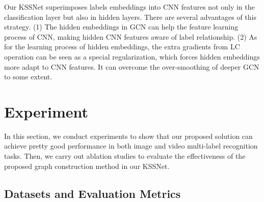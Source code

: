 \documentclass[letterpaper]{article} \usepackage{aaai20}  \usepackage{times}  \usepackage{helvet} \usepackage{courier}  \usepackage[hyphens]{url}  \usepackage{graphicx} \usepackage{subfigure}
\begin{document}
\begin{table*}[!t]
	\centering
	\footnotesize
\caption{Performance comparisons between baselines and KSSNet on MS-COCO. KSSNet is based on our proposed KS graph and has four GCN layers.}
	\label{coco}
	\end{table*}
Our KSSNet superimposes labels embeddings into CNN features not only in the classification layer but also in hidden layers. There are several advantages of this strategy. (1) The hidden embeddings in GCN can help the feature learning process of CNN, making hidden CNN features aware of label relationship. (2) As for the learning process of hidden embeddings, the extra gradients from LC operation can be seen as a special regularization, which forces hidden embeddings more adapt to CNN features. It can overcome the over-smoothing of deeper GCN to some extent.



\section{Experiment}
In this section, we conduct experiments to show that our proposed solution can achieve pretty good performance in both image and video multi-label recognition tasks. Then, we carry out ablation studies to evaluate the effectiveness of the proposed graph construction method in our KSSNet. 

\subsection{Datasets and Evaluation Metrics}
\end{document}
